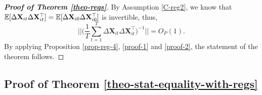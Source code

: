 \begin{proof}[\textnormal{\textbf{Proof of Theorem \ref{theo-regs}}}]
By Assumption \ref{C-reg2}, we know that $\mathbb{E} [\Delta \mathbf{X}_{it} \Delta \mathbf{X}_{it}^\top] = \mathbb{E} [\Delta \mathbf{X}_{i0} \Delta \mathbf{X}_{i0}^\top]$ is invertible, thus, 
\[\Bigg| \Bigg| \Big(\frac{1}{T}\sum_{t=1}^T\Delta \mathbf{X}_{it} \Delta \mathbf{X}_{it}^\top\Big)^{-1}\Bigg|\Bigg| = O_P(1).\]
By applying Proposition \ref{prop-reg-4}, \eqref{proof-1} and \eqref{proof-2}, the statement of the theorem follows.
\end{proof}

\subsection{Proof of Theorem \ref{theo-stat-equality-with-regs}}\label{subsec-appendix-stat-equaility}
